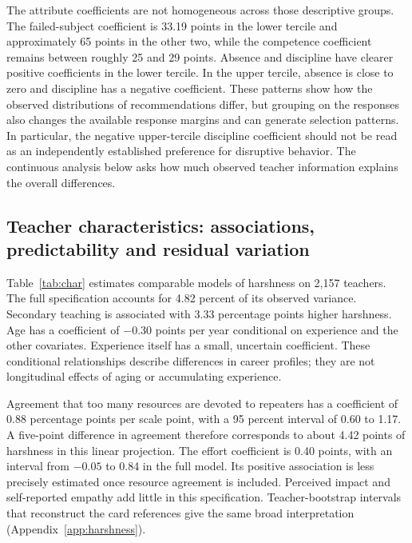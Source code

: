 The attribute coefficients are not homogeneous across those descriptive groups. The failed-subject coefficient is 33.19 points in the lower tercile and approximately 65 points in the other two, while the competence coefficient remains between roughly 25 and 29 points. Absence and discipline have clearer positive coefficients in the lower tercile. In the upper tercile, absence is close to zero and discipline has a negative coefficient. These patterns show how the observed distributions of recommendations differ, but grouping on the responses also changes the available response margins and can generate selection patterns. In particular, the negative upper-tercile discipline coefficient should not be read as an independently established preference for disruptive behavior. The continuous analysis below asks how much observed teacher information explains the overall differences.

\subsection{Teacher characteristics: associations, predictability and residual variation}
Table~\ref{tab:char} estimates comparable models of harshness on 2,157 teachers. The full specification accounts for 4.82 percent of its observed variance. Secondary teaching is associated with 3.33 percentage points higher harshness. Age has a coefficient of $-0.30$ points per year conditional on experience and the other covariates. Experience itself has a small, uncertain coefficient. These conditional relationships describe differences in career profiles; they are not longitudinal effects of aging or accumulating experience.

Agreement that too many resources are devoted to repeaters has a coefficient of 0.88 percentage points per scale point, with a 95 percent interval of 0.60 to 1.17. A five-point difference in agreement therefore corresponds to about 4.42 points of harshness in this linear projection. The effort coefficient is 0.40 points, with an interval from $-0.05$ to 0.84 in the full model. Its positive association is less precisely estimated once resource agreement is included. Perceived impact and self-reported empathy add little in this specification. Teacher-bootstrap intervals that reconstruct the card references give the same broad interpretation (Appendix~\ref{app:harshness}).

